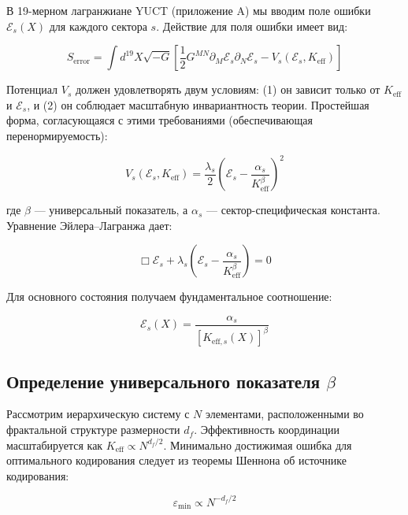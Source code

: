 \documentclass[12pt,a4paper]{article}
\theoremstyle{remark}
\newcommand{\Keff}{K_{\mathrm{eff}}}
\newcommand{\eps}{\varepsilon}
\newcommand{\df}{d_{\!f}}
\begin{document}
	В 19-мерном лагранжиане YUCT (приложение A) мы вводим поле ошибки $\mathcal{E}_s(X)$ для каждого сектора $s$. Действие для поля ошибки имеет вид:
	
	\begin{equation}
		S_{\text{error}} = \int d^{19}X \sqrt{-G} \left[ \frac{1}{2} G^{MN} \partial_M \mathcal{E}_s \partial_N \mathcal{E}_s - V_s(\mathcal{E}_s, \Keff) \right]
		\label{eq:error-action}
	\end{equation}
	
	Потенциал $V_s$ должен удовлетворять двум условиям: (1) он зависит только от $\Keff$ и $\mathcal{E}_s$, и (2) он соблюдает масштабную инвариантность теории. Простейшая форма, согласующаяся с этими требованиями (обеспечивающая перенормируемость):
	
	\begin{equation}
		V_s(\mathcal{E}_s, \Keff) = \frac{\lambda_s}{2} \left( \mathcal{E}_s - \frac{\alpha_s}{\Keff^{\beta}} \right)^2
		\label{eq:error-potential}
	\end{equation}
	
	где $\beta$ — универсальный показатель, а $\alpha_s$ — сектор-специфическая константа. Уравнение Эйлера–Лагранжа дает:
	
	\begin{equation}
		\Box \mathcal{E}_s + \lambda_s \left( \mathcal{E}_s - \frac{\alpha_s}{\Keff^{\beta}} \right) = 0
		\label{eq:error-eom}
	\end{equation}
	
	Для основного состояния получаем фундаментальное соотношение:
	
	\begin{equation}
		\mathcal{E}_s(X) = \frac{\alpha_s}{[K_{\mathrm{eff},s}(X)]^{\beta}}
		\label{eq:error-ground}
	\end{equation}
	
	\subsection{Определение универсального показателя $\beta$}
	
	Рассмотрим иерархическую систему с $N$ элементами, расположенными во фрактальной структуре размерности $\df$. Эффективность координации масштабируется как $\Keff \propto N^{\df/2}$. Минимально достижимая ошибка для оптимального кодирования следует из теоремы Шеннона об источнике кодирования:
	
	\begin{equation}
		\eps_{\min} \propto N^{-\df/2}
		\label{eq:shannon-bound}
	\end{equation}
	
\end{document}
